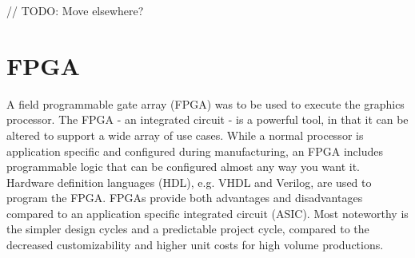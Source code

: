 // TODO: Move elsewhere?
\section{FPGA}
A field programmable gate array (FPGA) was to be used to execute the graphics processor.
The FPGA - an integrated circuit - is a powerful tool, in that it can be altered to support a wide array of use cases.
While a normal processor is application specific and configured during manufacturing, an FPGA includes programmable logic that can be configured almost any way you want it\cite{fpga}.
Hardware definition languages (HDL), e.g. VHDL and Verilog, are used to program the FPGA.
FPGAs provide both advantages and disadvantages compared to an application specific integrated circuit (ASIC).
Most noteworthy is the simpler design cycles and a predictable project cycle, compared to the decreased customizability and higher unit costs for high volume productions\cite{fpgavsasic}.

